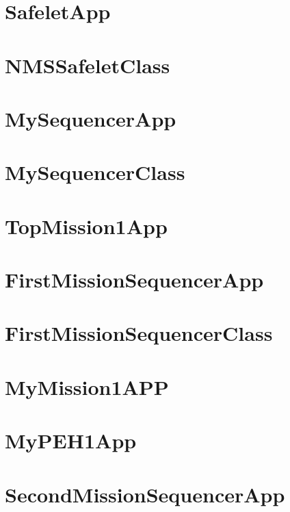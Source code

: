 \documentclass{article}
\begin{document}
\section{SafeletApp}

\newpage

\section{NMSSafeletClass}

\newpage

\section{MySequencerApp}

\newpage

\section{MySequencerClass}

\newpage

\section{TopMission1App}

\newpage

\section{FirstMissionSequencerApp}

\newpage

\section{FirstMissionSequencerClass}

\newpage

\section{MyMission1APP}

\newpage

\section{MyPEH1App}

\newpage



\section{SecondMissionSequencerApp}

\newpage
\end{document}
